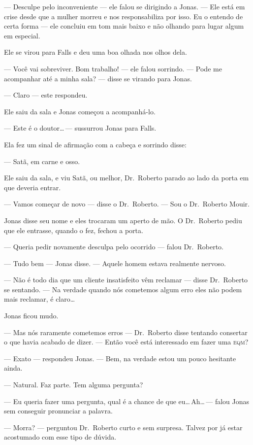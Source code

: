 --- Desculpe pelo inconveniente --- ele falou se dirigindo a Jonas. --- Ele está em crise desde que a mulher morreu e nos responsabiliza por isso. Eu o entendo de certa forma --- ele concluiu em tom mais baixo e não olhando para lugar algum em especial.

Ele se virou para Falls e deu uma boa olhada nos olhos dela.

--- Você vai sobreviver. Bom trabalho! --- ele falou sorrindo. --- Pode me acompanhar até a minha sala? --- disse se virando para Jonas.

--- Claro --- este respondeu.

Ele saiu da sala e Jonas começou a acompanhá-lo.

--- Este é o doutor\ldots\,--- sussurrou Jonas para Falls.

Ela fez um sinal de afirmação com a cabeça e sorrindo disse:

--- Satã, em carne e osso.

Ele saiu da sala, e viu Satã, ou melhor, Dr.~Roberto parado ao lado da porta em que deveria entrar.

--- Vamos começar de novo --- disse o Dr.~Roberto. --- Sou o Dr.~Roberto Mouir.

Jonas disse seu nome e eles trocaram um aperto de mão. O Dr.~Roberto pediu que ele entrasse, quando o fez, fechou a porta.

--- Queria pedir novamente desculpa pelo ocorrido --- falou Dr.~Roberto.

--- Tudo bem --- Jonas disse. --- Aquele homem estava realmente nervoso.

--- Não é todo dia que um cliente insatisfeito vêm reclamar --- disse Dr.~Roberto se sentando. --- Na verdade quando nós cometemos algum erro eles não podem mais reclamar, é claro\ldots

Jonas ficou mudo.

--- Mas nós raramente cometemos erros --- Dr.~Roberto disse tentando consertar o que havia acabado de dizer. --- Então você está interessado em fazer uma \textsc{eqm}?

--- Exato --- respondeu Jonas. --- Bem, na verdade estou um pouco hesitante ainda.

--- Natural. Faz parte. Tem alguma pergunta?

--- Eu queria fazer uma pergunta, qual é a chance de que eu\ldots\,Ah\ldots\,--- falou Jonas sem conseguir pronunciar a palavra.

--- Morra? --- perguntou Dr.~Roberto curto e sem surpresa. Talvez por já estar acostumado com esse tipo de dúvida.

